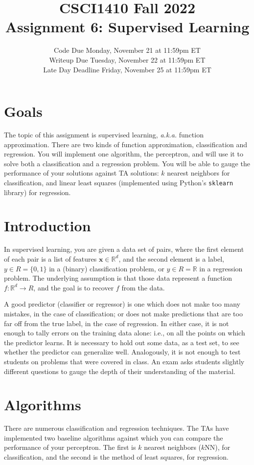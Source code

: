 \documentclass{article}
\title{CSCI1410 Fall 2022 \\
Assignment 6: Supervised Learning}
\date{Code Due Monday, November 21 at 11:59pm ET\\ [1ex]
Writeup Due Tuesday, November 22 at 11:59pm ET\\ [1ex]
Late Day Deadline Friday, November 25 at 11:59pm ET
}
\begin{document}
\maketitle


\section{Goals}

The topic of this assignment is supervised learning, \emph{a.k.a.\/} function approximation.
There are two kinds of function approximation, classification and regression.
You will implement one algorithm, the perceptron, and will use it to solve both a classification and a regression problem.
You will be able to gauge the performance of your solutions against TA solutions:
$k$ nearest neighbors for classification,
and linear least squares (implemented using Python's \texttt{sklearn} library) for regression.


\section{Introduction}

In supervised learning, you are given a data set of pairs,
where the first element of each pair is a list of features $\bm{x} \in \mathbb{R}^{d}$,
and the second element is a label, $y \in R = \{ 0,1 \}$ in a (binary) classification problem,
or $y \in R = \mathbb{R}$ in a regression problem.
The underlying assumption is that those data represent a function $f: \mathbb{R}^{d} \to R$,
and the goal is to recover $f$ from the data.

A good predictor (classifier or regressor) is one which does not make too many mistakes, in the case of classification;
or does not make predictions that are too far off from the true label, in the case of regression.
In either case, it is not enough to tally errors on the training data alone: i.e., on all the points on which the predictor learns.
It is necessary to hold out some data, as a test set, to see whether the predictor can generalize well.
Analogously, it is not enough to test students on problems that were covered in class.
An exam asks students slightly different questions to gauge the depth of their understanding of the material.


\section{Algorithms}

There are numerous classification and regression techniques.
The TAs have implemented two baseline algorithms against which you can compare the performance of your perceptron.
The first is $k$ nearest neighbors ($k$NN), for classification,
and the second is the method of least squares, for regression.
\end{document}
